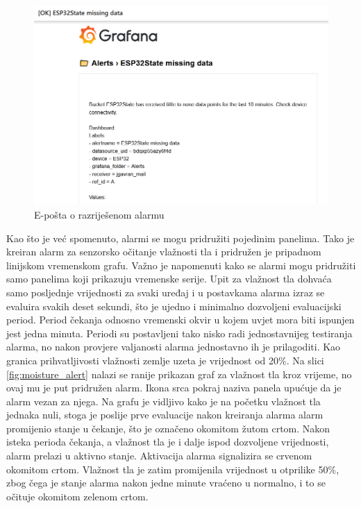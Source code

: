 \begin{figure}[ht]
	\centering
	\includegraphics[scale=0.6]{imgs/alert_mail}
	\caption{E-pošta o razriješenom alarmu}
	\label{fig:alert_mail}
\end{figure}

Kao što je već spomenuto, alarmi se mogu pridružiti pojedinim panelima. Tako je kreiran alarm za senzorsko očitanje vlažnosti tla i pridružen je pripadnom linijskom vremenskom grafu. Važno je napomenuti kako se alarmi mogu pridružiti samo panelima koji prikazuju vremenske serije. Upit za vlažnost tla dohvaća samo posljednje vrijednosti za svaki uređaj i u postavkama alarma izraz se evaluira svakih deset sekundi, što je ujedno i minimalno dozvoljeni evaluacijski period. Period čekanja odnosno vremenski okvir u kojem uvjet mora biti ispunjen jest jedna minuta. Periodi su postavljeni tako nisko radi jednostavnijeg testiranja alarma, no nakon provjere valjanosti alarma jednostavno ih je prilagoditi. Kao granica prihvatljivosti vlažnosti zemlje uzeta je vrijednost od 20\%. Na slici \ref{fig:moisture_alert} nalazi se ranije prikazan graf za vlažnost tla kroz vrijeme, no ovaj mu je put pridružen alarm. Ikona srca pokraj naziva panela upućuje da je alarm vezan za njega. Na grafu je vidljivo kako je na početku vlažnost tla jednaka nuli, stoga je poslije prve evaluacije nakon kreiranja alarma alarm promijenio stanje u čekanje, što je označeno okomitom žutom crtom. Nakon isteka perioda čekanja, a vlažnost tla je i dalje ispod dozvoljene vrijednosti, alarm prelazi u aktivno stanje. Aktivacija alarma signalizira se crvenom okomitom crtom. Vlažnost tla je zatim promijenila vrijednost u otprilike 50\%, zbog čega je stanje alarma nakon jedne minute vraćeno u normalno, i to se očituje okomitom zelenom crtom.

